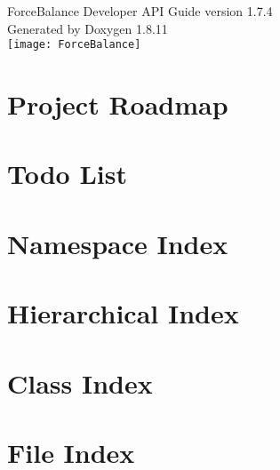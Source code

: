 \documentclass[letterpaper]{article}
\newcommand{\+}{\discretionary{\mbox{\scriptsize$\hookleftarrow$}}{}{}}
\begin{document}
\hypersetup{pageanchor=false,citecolor=blue}
\begin{titlepage}
\vspace*{1cm}
\begin{center}

{\Large ForceBalance Developer API Guide version 1.7.4}\\
\vspace*{2cm}
{\large Generated by Doxygen 1.8.11}\\
\vspace*{2.5 cm}
\texttt{[image: ForceBalance]}
\end{center}
\end{titlepage}
\tableofcontents
{}
\hypersetup{pageanchor=true,citecolor=blue}
\section{Project Roadmap}
\label{roadmap}

\section{Todo List}
\label{todo}

\section{Namespace Index}

\section{Hierarchical Index}

\section{Class Index}

\section{File Index}

\end{document}
